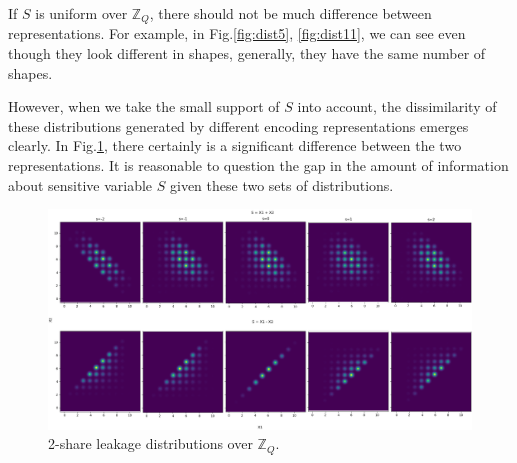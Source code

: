 \documentclass{llncs}
\begin{document}
	If $S$ is uniform over $\mathbb{Z}_Q$, there should not be much difference between representations. For example, in Fig.\ref{fig:dist5}, \ref{fig:dist11}, we can see even though they look different in shapes, generally, they have the same number of shapes.
	
	However, when we take the small support of $S$ into account, the dissimilarity of these distributions generated by different encoding representations emerges clearly. In  Fig.\ref{fig:dist}, there certainly is a significant difference between the two representations. It is reasonable to question the gap in the amount of information about sensitive variable $S$ given these two sets of distributions.
	\begin{figure}
		\centering \includegraphics[scale=0.25]{figures/3329_dist_modes.png}
		\caption{2-share leakage distributions over $\mathbb{Z}_Q$.}\label{fig:dist}\vspace*{-0.0cm}
	\end{figure}
	
\end{document}
